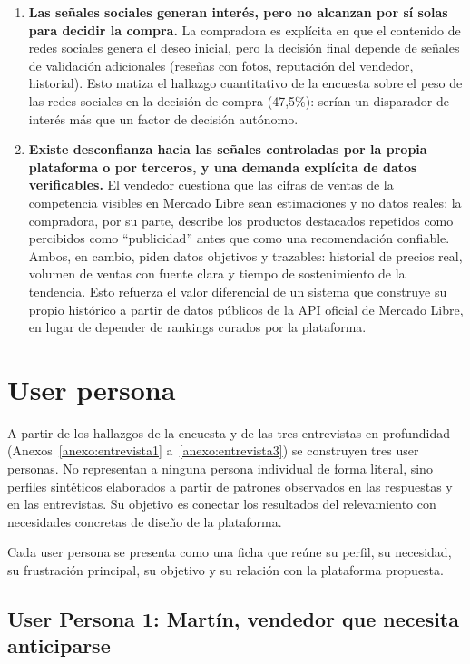 \begin{enumerate}
	\item \textbf{Las señales sociales generan interés, pero no alcanzan por sí solas para decidir la compra.} La compradora es explícita en que el contenido de redes sociales genera el deseo inicial, pero la decisión final depende de señales de validación adicionales (reseñas con fotos, reputación del vendedor, historial). Esto matiza el hallazgo cuantitativo de la encuesta sobre el peso de las redes sociales en la decisión de compra (47,5\%): serían un disparador de interés más que un factor de decisión autónomo.
	\item \textbf{Existe desconfianza hacia las señales controladas por la propia plataforma o por terceros, y una demanda explícita de datos verificables.} El vendedor cuestiona que las cifras de ventas de la competencia visibles en Mercado Libre sean estimaciones y no datos reales; la compradora, por su parte, describe los productos destacados repetidos como percibidos como ``publicidad'' antes que como una recomendación confiable. Ambos, en cambio, piden datos objetivos y trazables: historial de precios real, volumen de ventas con fuente clara y tiempo de sostenimiento de la tendencia. Esto refuerza el valor diferencial de un sistema que construye su propio histórico a partir de datos públicos de la API oficial de Mercado Libre, en lugar de depender de rankings curados por la plataforma.
\end{enumerate}

\section{User persona}

A partir de los hallazgos de la encuesta y de las tres entrevistas en profundidad (Anexos~\ref{anexo:entrevista1} a~\ref{anexo:entrevista3}) se construyen tres user personas. No representan a ninguna persona individual de forma literal, sino perfiles sintéticos elaborados a partir de patrones observados en las respuestas y en las entrevistas. Su objetivo es conectar los resultados del relevamiento con necesidades concretas de diseño de la plataforma.

Cada user persona se presenta como una ficha que reúne su perfil, su necesidad, su frustración principal, su objetivo y su relación con la plataforma propuesta.

\subsection*{User Persona 1: Martín, vendedor que necesita anticiparse}

